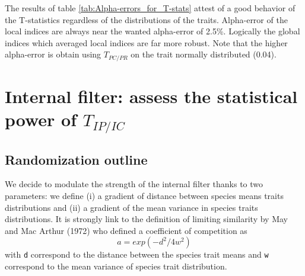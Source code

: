 \documentclass[12pt]{article}\usepackage[]{graphicx}\usepackage[]{color}
\begin{document}
The results of table \ref{tab:Alpha-errors_for_T-stats} attest of a good behavior of the T-statistics regardless of the distributions of the traits. Alpha-error of the local indices are always near the wanted alpha-error of 2.5\%. Logically the global indices which averaged local indices are far more robust. Note that the higher alpha-error is obtain using $T_{PC/PR}$ on the trait normally distributed (0.04).















































\cleardoublepage

\section{Internal filter: assess the statistical power of $T_{IP/IC}$}
  \subsection {Randomization outline}
 
We decide to modulate the strength of the internal filter thanks to two parameters:
we define (i) a gradient of distance between species means traits distributions and (ii) a gradient of the mean variance in species traits distributions. It is strongly link to the definition of limiting similarity by May and Mac Arthur (1972) who defined a coefficient of competition as $$a = exp (-d^2/4w^2)$$ with \texttt{d} correspond to the distance between the species trait means and \texttt{w} correspond to the mean variance of species trait distribution. 
\end{document}
